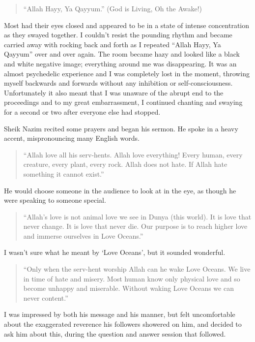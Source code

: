 \documentclass[12pt]{memoir}
\newcommand{\cor}[2]{#2} %
\def\–{-\hskip0pt}
\begin{document}
\begin{quote}
“Allah Hayy, Ya Qayyum.” (God is Living, Oh the Awake!)
\end{quote}

Most had their eyes closed and appeared to be
in a state of intense concentration as they swayed together.
I couldn’t resist the pounding rhythm
and became carried away with rocking back
and forth as I repeated “Allah Hayy, Ya Qayyum” over and over again.
The room became hazy and looked like a black and white negative image;
everything around me was disappearing.
It was an almost psychedelic experience
and I was completely lost in the moment,
throwing myself backwards and forwards without any inhibition
or self\cor{ }{\–}consciousness.
Unfortunately it also meant that I was unaware of the abrupt end
to the proceedings and to my great embarrassment,
I continued chanting and swaying for a second or two
after everyone else had stopped.

Sheik Nazim recited some prayers and began his sermon.
He spoke in a heavy accent, mispronouncing many English words.

\begin{quote}
“Allah love all his serv-hents. Allah love everything!
Every human, every creature, every plant, every rock.
Allah does not hate. If Allah hate something it cannot exist.”
\end{quote}

He would choose someone in the audience to look at in the eye,
as though he were speaking to someone special.

\begin{quote}
“Allah’s love is not animal love we see in Dunya (this world).
It is love that never change. It is love that never die.
Our purpose is to reach higher love and immerse ourselves in Love Oceans.”
\end{quote}

I wasn’t sure what he meant by ‘Love Oceans’, but it sounded wonderful.

\begin{quote}
“Only when the serv-hent worship Allah can he wake Love Oceans.
We live in time of hate and misery.
Most human know only physical love and so become unhappy and miserable.
Without waking Love Oceans we can never content.”
\end{quote}

I was impressed by both his message and his manner,
but felt uncomfortable about the exaggerated reverence
his followers showered on him,
and decided to ask him about this,
during the question and answer session that followed.
\end{document}
